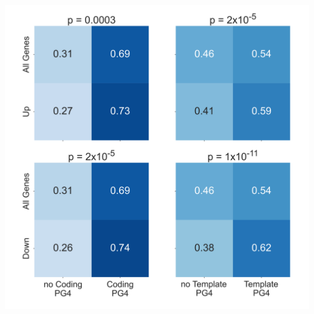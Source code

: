 \documentclass[12pt,a4paper,]{report}
\let\origfigure=\figure
\let\endorigfigure=\endfigure
\renewenvironment{figure}[1][2] {
    \expandafter\origfigure\expandafter[H]
} {
    \endorigfigure
}
\begin{document}
\begin{figure}[htbp]
\centering
\includegraphics[width=\textwidth,height=562pt,keepaspectratio]{chapter_5/figures/drought_g4_presence_absence_chisquared.png}
\caption[Drought downregulated genes are enriched in PG4s]{\textbf{Drought   downregulated   genes   are   enriched   in   PG4s}   Heatmaps   showing   fractions   of   genes   containing   at   least   one   predicted   G4   in   their   gene   body   for   drought   upregulated   genes   vs   all   genes   (top   row)   and   drought   downregulated   genes   vs   all   genes   (bottom   row)   (For   down   and   upregulated   genes,   FDR   <   0.05   and   absolute   logFC   >   0.5).   PG4   predictions   for   the   coding   strand   are   in   the   left   hand   column   whilst   PG4   predictions   for   template   strand   are   on   the   right.   P   values   for   each   heatmap   are   calculated   using   Chi-squared   tests.   Genes   downregulated   by   drought   stress   show   a   particularly   strong   enrichment   of   PG4s,   and   particularly   on   the   template   strand.   \label{drought_g4_sq}}
\end{figure}
\end{document}

